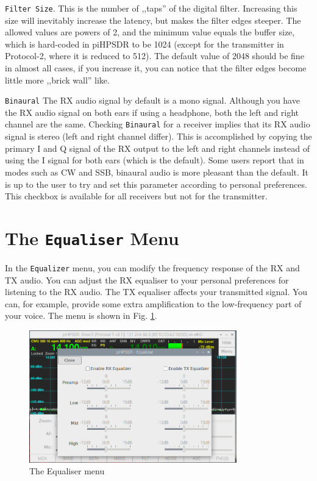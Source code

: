 \documentclass[12pt]{book}
\def\rett#1{\texttt{\color{red}#1}}
\def\bltt#1{\texttt{\color{blue}#1}}
\def\pH{pi\-HPSDR\xspace}
\begin{document}
\rett{Filter Size}. This is the number of ,,taps'' of the digital
filter. Increasing this size will inevitably increase the latency,
but makes the filter edges steeper. The allowed values are
powers of 2, and the minimum value equals the buffer size, which
is hard-coded in \pH to be 1024 (except for the transmitter in Protocol-2,
where it is reduced to 512). The default value of 2048 should be
fine in almost all cases, if you increase it, you can notice that
the filter edges become little more ,,brick wall'' like.

\rett{Binaural} The RX audio signal by default is a mono signal. Although
you have the RX audio signal on both ears if using a headphone, both the
left and right channel are the same. Checking \rett{Binaural} for a
receiver implies that its RX audio signal is stereo (left and right channel
differ). This is accomplished by copying the primary I and Q signal of the
RX output to the left and right channels instead of using the I signal
for both ears (which is the default). Some users report that in modes
such as CW and SSB, binaural audio is more pleasant than the default.
It is up to the user to try and set this parameter according to personal
preferences. This checkbox is available for all receivers but not for the
transmitter.

\section{The \texttt{Equaliser} Menu}

In the \bltt{Equalizer} menu, you can modify the frequency response of
the RX and TX audio. You can adjust the RX equaliser to your personal
preferences for listening to the RX audio. The TX equaliser affects
your transmitted signal. You can, for example, provide some extra
amplification to the low-frequency part of your voice. The menu
is shown in Fig. \ref{fig:EqualizerMenu}.

\begin{figure}[ht]
\center
\includegraphics[width=9cm]{EqualizerMenu.png}
\caption{The Equaliser menu}
\label{fig:EqualizerMenu}
\end{figure}
\end{document}
